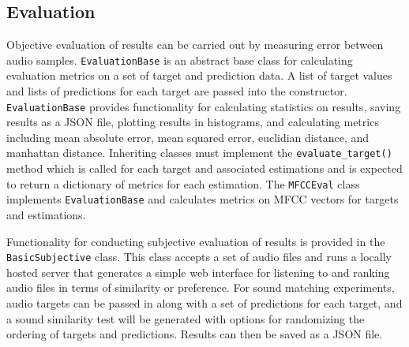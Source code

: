 \subsection{Evaluation}
Objective evaluation of results can be carried out by measuring error between audio samples. \texttt{EvaluationBase} is an abstract base class for calculating evaluation metrics on a set of target and prediction data. A list of target values and lists of predictions for each target are passed into the constructor. \texttt{EvaluationBase} provides functionality for calculating statistics on results, saving results as a JSON file, plotting results in histograms, and calculating metrics including mean absolute error, mean squared error, euclidian distance, and manhattan distance. Inheriting classes must implement the \texttt{evaluate_target()} method which is called for each target and associated estimations and is expected to return a dictionary of metrics for each estimation. The \texttt{MFCCEval} class implements \texttt{EvaluationBase} and calculates metrics on MFCC vectors for targets and estimations.

Functionality for conducting subjective evaluation of results is provided in the \texttt{BasicSubjective} class. This class accepts a set of audio files and runs a locally hosted server that generates a simple web interface for listening to and ranking audio files in terms of similarity or preference. For sound matching experiments, audio targets can be passed in along with a set of predictions for each target, and a sound similarity test will be generated with options for randomizing the ordering of targets and predictions. Results can then be saved as a JSON file.




